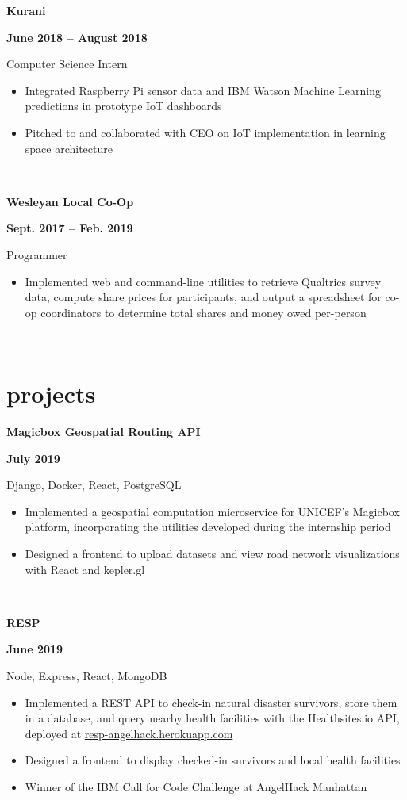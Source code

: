 \documentclass[letterpaper, 11pt]{article}
\newcommand{\expentry}[5]{

    \begin{minipage}[b]{0.5\textwidth}
        \raggedright
        \bf\large #3
        \end{minipage}%
        \begin{minipage}[b]{0.5\textwidth}
        \raggedleft
        \bf {#1} -- {#2}
        \end{minipage}

    \begin{minipage}[t]{\linewidth}
    \vspace{-3mm}
    #4
    \vspace{-2.5mm}
    \small{#5}
    \end{minipage}\\
    \vspace{1mm}
    }
\newcommand{\projectentry}[4]{

    \begin{minipage}[b]{0.5\textwidth}
        \raggedright
        \bf #2
        \end{minipage}%
        \begin{minipage}[b]{0.5\textwidth}
        \raggedleft
        \bf #1
        \end{minipage}

    \begin{minipage}[t]{\linewidth}
    \vspace{-3mm}
    \small #3
    \vspace{-2.5mm}
    \small{#4}
    \end{minipage}\\
    \vspace{1mm}
    }
\begin{document}
    \expentry{June 2018}
    {August 2018}
    {Kurani}
    {Computer Science Intern}
    {\begin{itemize}
          \setlength\itemsep{0.1mm}
          \item Integrated Raspberry Pi sensor data and IBM Watson Machine Learning predictions in prototype IoT dashboards
          \item Pitched to and collaborated with CEO on IoT implementation in learning space architecture 
        \end{itemize}
    }

    \expentry{Sept. 2017}
    {Feb. 2019}
    {Wesleyan Local Co-Op}
    {Programmer}
    {\begin{itemize}
          \setlength\itemsep{0.1mm}
          \item Implemented web and command-line utilities to retrieve Qualtrics survey data, compute share prices for participants, and output a spreadsheet for co-op coordinators to determine total shares and money owed per-person
        \end{itemize}
    }

    \section{projects}

        \projectentry{July 2019}
            {Magicbox Geospatial Routing API}
            {Django, Docker, React, PostgreSQL}
            {\begin{itemize}
                \setlength\itemsep{0.1mm}
                \item Implemented a geospatial computation microservice for UNICEF's Magicbox platform, incorporating the utilities developed during the internship period
                \item Designed a frontend to upload datasets and view road network visualizations with React and kepler.gl
            \end{itemize}
            }

        \projectentry{June 2019}
            {RESP}
            {Node, Express, React, MongoDB}
            {\begin{itemize}
                \setlength\itemsep{0.1mm}
                \item Implemented a REST API to check-in natural disaster survivors, store them in a database, and query nearby health facilities with the Healthsites.io API, deployed at \href{http://resp-angelhack.herokuapp.com}{resp-angelhack.herokuapp.com}
                \item Designed a frontend  to display checked-in survivors and local health facilities
                \item Winner of the IBM Call for Code Challenge at AngelHack Manhattan
            \end{itemize}
            }
            
\end{document}
